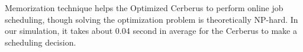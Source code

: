 
Memorization technique helps the Optimized Cerberus to perform online job scheduling,
though solving the optimization problem is theoretically NP-hard.
In our simulation, it takes about 0.04 second in average for the Cerberus to make a scheduling decision.


